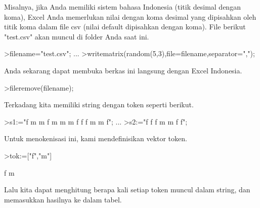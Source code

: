 \documentclass[a4paper,10pt]{article}
\begin{document}
\begin{eulernotebook}
\begin{eulercomment}
\begin{eulercomment}
\begin{eulercomment}
\begin{eulercomment}
\begin{eulercomment}
\begin{eulercomment}
\begin{eulercomment}
\begin{eulercomment}
\begin{eulercomment}
\begin{eulercomment}
\begin{eulercomment}
\begin{eulercomment}
\begin{eulercomment}
\begin{eulercomment}
\begin{eulercomment}
\begin{eulercomment}
\begin{eulercomment}
\begin{eulercomment}
\begin{eulercomment}
\begin{eulercomment}
\begin{eulercomment}
\begin{eulercomment}
\begin{eulercomment}
\begin{eulercomment}
\begin{eulercomment}
\begin{eulercomment}
\begin{eulercomment}
\begin{eulercomment}
\begin{eulercomment}
\begin{eulercomment}
\begin{eulercomment}
\begin{eulercomment}
\begin{eulercomment}
\begin{eulercomment}
\begin{eulercomment}
\begin{eulercomment}
\begin{eulercomment}
Misalnya, jika Anda memiliki sistem bahasa Indonesia (titik desimal
dengan koma), Excel Anda memerlukan nilai dengan koma desimal yang
dipisahkan oleh titik koma dalam file csv (nilai default dipisahkan
dengan koma). File berikut "test.csv" akan muncul di folder Anda saat
ini.
\end{eulercomment}
\begin{eulerprompt}
>filename="test.csv"; ...
>writematrix(random(5,3),file=filename,separator=",");
\end{eulerprompt}
\begin{eulercomment}
Anda sekarang dapat membuka berkas ini langsung dengan Excel
Indonesia.
\end{eulercomment}
\begin{eulerprompt}
>fileremove(filename);
\end{eulerprompt}
\begin{eulercomment}
Terkadang kita memiliki string dengan token seperti berikut.
\end{eulercomment}
\begin{eulerprompt}
>s1:="f m m f m m m f f f m m f";  ...
>s2:="f f f m m f f";
\end{eulerprompt}
\begin{eulercomment}
Untuk menokenisasi ini, kami mendefinisikan vektor token.
\end{eulercomment}
\begin{eulerprompt}
>tok:=["f","m"]
\end{eulerprompt}
\begin{euleroutput}
  f
  m
\end{euleroutput}
\begin{eulercomment}
Lalu kita dapat menghitung berapa kali setiap token muncul dalam
string, dan memasukkan hasilnya ke dalam tabel.

\end{eulercomment}
\end{eulercomment}
\end{eulercomment}
\end{eulercomment}
\end{eulercomment}
\end{eulercomment}
\end{eulercomment}
\end{eulercomment}
\end{eulercomment}
\end{eulercomment}
\end{eulercomment}
\end{eulercomment}
\end{eulercomment}
\end{eulercomment}
\end{eulercomment}
\end{eulercomment}
\end{eulercomment}
\end{eulercomment}
\end{eulercomment}
\end{eulercomment}
\end{eulercomment}
\end{eulercomment}
\end{eulercomment}
\end{eulercomment}
\end{eulercomment}
\end{eulercomment}
\end{eulercomment}
\end{eulercomment}
\end{eulercomment}
\end{eulercomment}
\end{eulercomment}
\end{eulercomment}
\end{eulercomment}
\end{eulercomment}
\end{eulercomment}
\end{eulercomment}
\end{eulercomment}
\end{eulernotebook}
\end{document}
